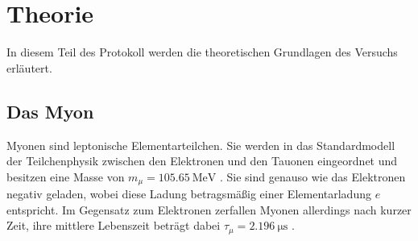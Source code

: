 \section{Theorie}
\label{sec:theorie}
In diesem Teil des Protokoll werden die theoretischen Grundlagen des Versuchs erläutert.
\subsection{Das Myon}
Myonen sind leptonische Elementarteilchen.
Sie werden in das Standardmodell der Teilchenphysik zwischen den Elektronen und den Tauonen eingeordnet und besitzen eine Masse von $m_\mu = \SI{105.65}{\mega\eV}$ \cite{myonen}.
Sie sind genauso wie das Elektronen negativ geladen, wobei diese Ladung betragsmäßig einer Elementarladung $e$ entspricht.
Im Gegensatz zum Elektronen zerfallen Myonen allerdings nach kurzer Zeit, ihre mittlere Lebenszeit beträgt dabei $\tau_\mu = \SI{2.196}{\micro\second}$ \cite{myonen}.
